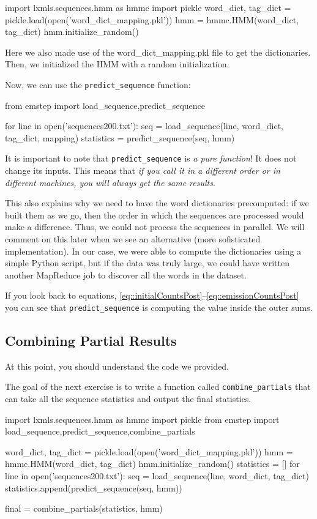 \begin{python}
import lxmls.sequences.hmm as hmmc
import pickle
word_dict, tag_dict  = pickle.load(open('word_dict_mapping.pkl'))
hmm = hmmc.HMM(word_dict, tag_dict)
hmm.initialize_random()
\end{python}

Here we also made use of the word\_dict\_mapping.pkl file to get the
dictionaries. Then, we initialized the HMM with a random initialization.

Now, we can use the \verb+predict_sequence+ function:

\begin{python}
from emstep import load_sequence,predict_sequence

for line in open('sequences200.txt'):
    seq = load_sequence(line, word_dict, tag_dict, mapping)
    statistics = predict_sequence(seq, hmm)
\end{python}

It is important to note that \verb+predict_sequence+ is \emph{a pure
function}! It does not change its inputs. This means that \emph{if you call it
in a different order or in different machines, you will always get the same
results}.

This also explains why we need to have the word dictionaries precomputed: if we
built them as we go, then the order in which the sequences are processed would
make a difference. Thus, we could not process the sequences in parallel. We
will comment on this later when we see an alternative (more sofisticated
implementation). In our case, we were able to compute the dictionaries using a
simple Python script, but if the data was truly large, we could have written
another MapReduce job to discover all the words in the dataset.

If you look back to equations,
\eqref{eq::initialCountsPost}--\eqref{eq::emissionCountsPost} you can see that
\verb+predict_sequence+ is computing the value inside the outer sums.

\subsection{Combining Partial Results}
At this point, you should understand the code we provided.

The goal of the next exercise is to write a function called \verb+combine_partials+
that can take all the sequence statistics and output the final statistics.

\begin{python}
import lxmls.sequences.hmm as hmmc
import pickle
from emstep import load_sequence,predict_sequence,combine_partials

word_dict, tag_dict = pickle.load(open('word_dict_mapping.pkl'))
hmm = hmmc.HMM(word_dict, tag_dict)
hmm.initialize_random()
statistics = []
for line in open('sequences200.txt'):
    seq = load_sequence(line, word_dict, tag_dict)
    statistics.append(predict_sequence(seq, hmm))

final = combine_partials(statistics, hmm)
\end{python}

